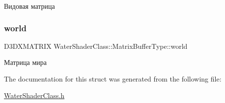 Видовая матрица 

\mbox{\label{struct_water_shader_class_1_1_matrix_buffer_type_a3d9e9c1b1d805ed195a92dbf0555b9fc}} 
\subsubsection{\texorpdfstring{world}{world}}
{\footnotesize\ttfamily D3\+D\+X\+M\+A\+T\+R\+IX Water\+Shader\+Class\+::\+Matrix\+Buffer\+Type\+::world}



Матрица мира 



The documentation for this struct was generated from the following file\+:\begin{DoxyCompactItemize}
\item 
\hyperlink{_water_shader_class_8h}{Water\+Shader\+Class.\+h}\end{DoxyCompactItemize}
